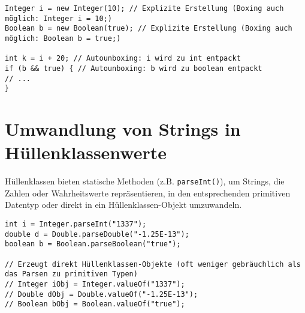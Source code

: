 \begin{lstlisting}[caption={Automatische Umwandlung durch Autoboxing/Autounboxing}]
Integer i = new Integer(10); // Explizite Erstellung (Boxing auch möglich: Integer i = 10;)
Boolean b = new Boolean(true); // Explizite Erstellung (Boxing auch möglich: Boolean b = true;)

int k = i + 20; // Autounboxing: i wird zu int entpackt
if (b && true) { // Autounboxing: b wird zu boolean entpackt
// ...
}
\end{lstlisting}

\section{Umwandlung von Strings in Hüllenklassenwerte}
\label{sec:umwandlung_strings}
Hüllenklassen bieten statische Methoden (z.B. \texttt{parseInt()}), um Strings, die Zahlen oder Wahrheitswerte repräsentieren, in den entsprechenden primitiven Datentyp oder direkt in ein Hüllenklassen-Objekt umzuwandeln.

\begin{lstlisting}[caption={Parsen von Strings zu primitiven Typen/Hüllenklassen}]
int i = Integer.parseInt("1337");
double d = Double.parseDouble("-1.25E-13");
boolean b = Boolean.parseBoolean("true");

// Erzeugt direkt Hüllenklassen-Objekte (oft weniger gebräuchlich als das Parsen zu primitiven Typen)
// Integer iObj = Integer.valueOf("1337");
// Double dObj = Double.valueOf("-1.25E-13");
// Boolean bObj = Boolean.valueOf("true");
\end{lstlisting}